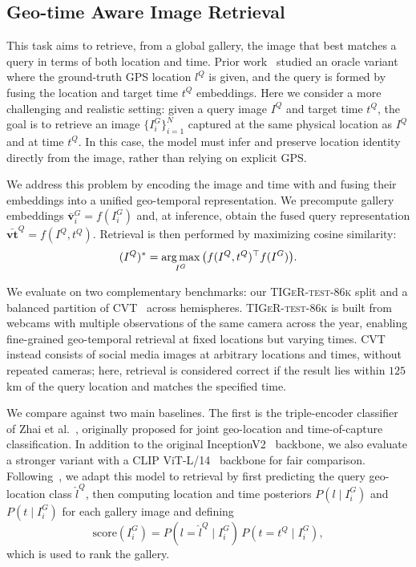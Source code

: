 \subsection{Geo-time Aware Image Retrieval}

This task aims to retrieve, from a global gallery, the image that best matches a query in terms of both location and time. Prior work~\cite{Shatwell_2025_ICCV} studied an oracle variant where the ground-truth GPS location $l^Q$ is given, and the query is formed by fusing the location and target time $t^Q$ embeddings. Here we consider a more challenging and realistic setting: given a query image $I^Q$ and target time $t^Q$, the goal is to retrieve an image $\{I_i^G\}_{i=1}^N$ captured at the same physical location as $I^Q$ and at time $t^Q$. In this case, the model must infer and preserve location identity directly from the image, rather than relying on explicit GPS.

We address this problem by encoding the image and time with \tiger and fusing their embeddings into a unified geo-temporal representation. We precompute gallery embeddings $\bar{\mathbf{v}}_i^G = f(I_i^G)$ and, at inference, obtain the fused query representation $\bar{\mathbf{vt}}^Q = f(I^Q, t^Q)$. Retrieval is then performed by maximizing cosine similarity:
\begin{equation}
    (I^Q)^* = \operatorname*{arg\,max}_{I^G} \big( f(I^Q, t^Q)^\top f(I^G) \big).
    \label{eq:optim-gtret}
\end{equation}

We evaluate on two complementary benchmarks: our \textsc{TIGeR-test-86k} split and a balanced partition of CVT~\cite{salem2020dynamic} across hemispheres. \textsc{TIGeR-test-86k} is built from webcams with multiple observations of the same camera across the year, enabling fine-grained geo-temporal retrieval at fixed locations but varying times. CVT instead consists of social media images at arbitrary locations and times, without repeated cameras; here, retrieval is considered correct if the result lies within $125$\,km of the query location and matches the specified time.

We compare \tiger against two main baselines. The first is the triple-encoder classifier of Zhai et al.~\cite{zhai2019learning}, originally proposed for joint geo-location and time-of-capture classification. In addition to the original InceptionV2~\cite{szegedy2016rethinking} backbone, we also evaluate a stronger variant with a CLIP ViT-L/14~\cite{clip} backbone for fair comparison. Following~\cite{Shatwell_2025_ICCV}, we adapt this model to retrieval by first predicting the query geo-location class $\hat{l}^Q$, then computing location and time posteriors $P(l \mid I_i^G)$ and $P(t \mid I_i^G)$ for each gallery image and defining
\[
\mathrm{score}(I_i^G) = P(l = \hat{l}^Q \mid I_i^G)\, P(t = t^Q \mid I_i^G),
\]
which is used to rank the gallery.


